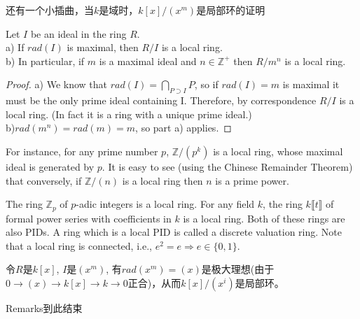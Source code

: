 还有一个小插曲，当$k$是域时，$k[x]/(x^m)$是局部环的证明
\begin{prop}
	 Let $I$ be an ideal in the ring $R$.\\
a) If $rad(I)$ is maximal, then $R/I$ is a local ring.\\
b) In particular, if $m$ is a maximal ideal and $n \in \mathbb{Z}^+$ then $R/m^n$ is a local ring.
\end{prop}
\begin{proof}
a) We know that $rad(I)=\bigcap_{P\supset I}P$, so if $rad(I) = m$ is maximal it must be the only prime ideal containing I. Therefore, by correspondence $R/I$ is a local ring. (In fact it is a ring with a unique prime ideal.)\\
b)$rad(m^n) = rad(m) = m$, so part a) applies. 
\end{proof}

\begin{example}
	For instance, for any prime number $p$, $\mathbb{Z}/(p^k)$ is a local ring, whose maximal ideal is generated by $p$. It is easy to see (using the Chinese Remainder Theorem) that conversely, if $\mathbb{Z}/(n)$ is a local ring then $n$ is a prime power. 

	The ring $\mathbb{Z}_p$ of $p$-adic integers is a local ring. For any field $k$, the ring $k\llbracket t\rrbracket $ of formal power series with coefficients in $k$ is a local ring. Both of these rings are also PIDs. A ring which is a local PID is called a discrete valuation ring. Note that a local ring is connected, i.e., $e^2 = e \Rightarrow e \in \{0,1\}$.

令$R$是$k[x]$, $I$是$(x^m)$, 有$rad(x^m)=(x)$是极大理想(由于$0\rightarrow (x) \rightarrow k[x]\rightarrow k \rightarrow 0$正合)，从而$k[x]/(x^i)$是局部环。
\end{example}
Remarks到此结束
